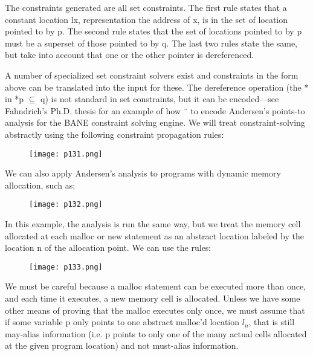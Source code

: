 The constraints generated are all set constraints. The first rule states that a constant location lx,
representation the address of x, is in the set of location pointed to by p. The second rule states that
the set of locations pointed to by p must be a superset of those pointed to by q. The last two rules
state the same, but take into account that one or the other pointer is dereferenced.

A number of specialized set constraint solvers exist and constraints in the form above can be
translated into the input for these. The dereference operation (the * in *p $\subseteq$ q)
is not standard in set constraints, but it can be encoded—see Fahndrich’s Ph.D. thesis for an example of how ¨
to encode Andersen’s points-to analysis for the BANE constraint solving engine. We will treat
constraint-solving abstractly using the following constraint propagation rules:


\begin{figure}[H]
	\centering
	\texttt{[image: p131.png]}
	\caption{}
	\label{fig:p131}
\end{figure}

We can also apply Andersen’s analysis to programs with dynamic memory allocation, such as:



\begin{figure}[H]
	\centering
	\texttt{[image: p132.png]}
	\caption{}
	\label{fig:p132}
\end{figure}


In this example, the analysis is run the same way, but we treat the memory cell allocated at
each malloc or new statement as an abstract location labeled by the location n of the allocation
point. We can use the rules:


\begin{figure}[H]
	\centering
	\texttt{[image: p133.png]}
	\caption{}
	\label{fig:p133}
\end{figure}



We must be careful because a malloc statement can be executed more than once, and each time
it executes, a new memory cell is allocated. Unless we have some other means of proving that
the malloc executes only once, we must assume that if some variable p only points to one abstract
malloc’d location $l_n$, that is still may-alias information (i.e. p points to only one of the many actual
cells allocated at the given program location) and not must-alias information.


